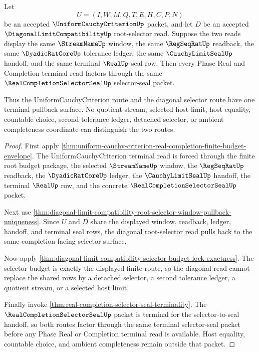 \begin{theorem}
\label{thm:uniform-cauchy-criterion-diagonal-selector-seal-pullback}
Let
$$
U=(I,W,M,Q,T,E,H,C,P,N)
$$
be an accepted $\UniformCauchyCriterionUp$ packet, and let $D$ be an accepted $\DiagonalLimitCompatibilityUp$ root-selector read. Suppose the two reads display the same $\StreamNameUp$ window, the same $\RegSeqRatUp$ readback, the same $\DyadicRatCoreUp$ tolerance ledger, the same $\CauchyLimitSealUp$ handoff, and the same terminal $\RealUp$ seal row. Then every Phase Real and Completion terminal read factors through the same $\RealCompletionSelectorSealUp$ selector-seal packet.

Thus the UniformCauchyCriterion route and the diagonal selector route have one terminal pullback surface. No quotient stream, selected host limit, host equality, countable choice, second tolerance ledger, detached selector, or ambient completeness coordinate can distinguish the two routes.
\end{theorem}
\begin{proof}
First apply \autoref{thm:uniform-cauchy-criterion-real-completion-finite-budget-envelope}. The UniformCauchyCriterion terminal read is forced through the finite root budget package, the selected $\StreamNameUp$ window, the $\RegSeqRatUp$ readback, the $\DyadicRatCoreUp$ ledger, the $\CauchyLimitSealUp$ handoff, the terminal $\RealUp$ row, and the concrete $\RealCompletionSelectorSealUp$ packet.

Next use \autoref{thm:diagonal-limit-compatibility-root-selector-window-pullback-uniqueness}. Since $U$ and $D$ share the displayed window, readback, ledger, handoff, and terminal seal rows, the diagonal root-selector read pulls back to the same completion-facing selector surface.

Now apply \autoref{thm:diagonal-limit-compatibility-selector-budget-lock-exactness}. The selector budget is exactly the displayed finite route, so the diagonal read cannot replace the shared rows by a detached selector, a second tolerance ledger, a quotient stream, or a selected host limit.

Finally invoke \autoref{thm:real-completion-selector-seal-terminality}. The $\RealCompletionSelectorSealUp$ packet is terminal for the selector-to-seal handoff, so both routes factor through the same terminal selector-seal packet before any Phase Real or Completion terminal read is available. Host equality, countable choice, and ambient completeness remain outside that packet.
\end{proof}

